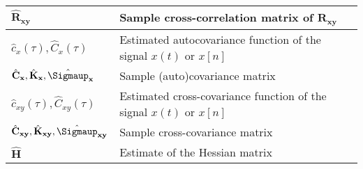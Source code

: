 \documentclass{article}
\begin{document}
\begin{xltabular}{\textwidth}{XX}
	\(\hat{\mathbf{R}}_\mathbf{xy}\)                                                                              & Sample cross-correlation matrix of \(\mathbf{R}_\mathbf{xy}\)                                              \\ \hline
	\(\hat{c}_x(\tau), \hat{C}_x(\tau)\)                                                                          & Estimated autocovariance function of the signal \(x(t)\) or \(x[n]\)                                       \\ \hline
	\(\hat{\mathbf{C}}_\mathbf{x}, \hat{\mathbf{K}}_\mathbf{x}, \hat{\boldsymbol{\Sigmaup}}_\mathbf{x}\)          & Sample (auto)covariance matrix                                                                             \\ \hline
	\(\hat{c}_{xy}(\tau), \hat{C}_{xy}(\tau)\)                                                                    & Estimated cross-covariance function of the signal \(x(t)\) or \(x[n]\)                                     \\ \hline
	\(\hat{\mathbf{C}}_{\mathbf{xy}}, \hat{\mathbf{K}}_{\mathbf{xy}}, \hat{\boldsymbol{\Sigmaup}}_{\mathbf{xy}}\) & Sample cross-covariance matrix                                                                             \\ \hline
	\(\hat{\mathbf{H}}\)                                                                                          & Estimate of the Hessian matrix
\end{xltabular}
\end{document}
